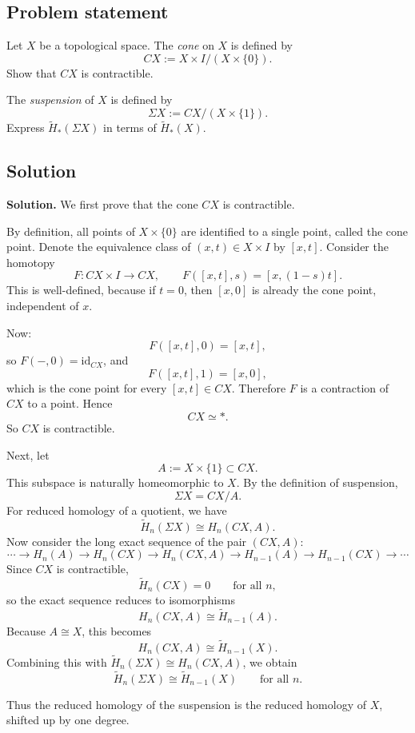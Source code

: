 \documentclass[12pt,a4paper]{article}
\theoremstyle{notespace}
\begin{document}
\subsection{Problem statement}

Let \(X\) be a topological space. The \emph{cone} on \(X\) is defined by
\[
CX := X\times I /(X\times \{0\}).
\]
Show that \(CX\) is contractible.

The \emph{suspension} of \(X\) is defined by
\[
\Sigma X := CX /(X\times \{1\}).
\]
Express \(\widetilde H_*(\Sigma X)\) in terms of \(\widetilde H_*(X)\).

\subsection{Solution}

\noindent\textbf{Solution.}
We first prove that the cone \(CX\) is contractible.

By definition, all points of \(X\times \{0\}\) are identified to a single point, called the cone point. Denote the equivalence class of \((x,t)\in X\times I\) by \([x,t]\). Consider the homotopy
\[
F:CX\times I \longrightarrow CX,
\qquad
F([x,t],s)=[x,(1-s)t].
\]
This is well-defined, because if \(t=0\), then \([x,0]\) is already the cone point, independent of \(x\).

Now:
\[
F([x,t],0)=[x,t],
\]
so \(F(-,0)=\mathrm{id}_{CX}\), and
\[
F([x,t],1)=[x,0],
\]
which is the cone point for every \([x,t]\in CX\). Therefore \(F\) is a contraction of \(CX\) to a point. Hence
\[
CX \simeq *.
\]
So \(CX\) is contractible.

Next, let
\[
A:=X\times \{1\}\subset CX.
\]
This subspace is naturally homeomorphic to \(X\). By the definition of suspension,
\[
\Sigma X = CX/A.
\]
For reduced homology of a quotient, we have
\[
\widetilde H_n(\Sigma X)\cong H_n(CX,A).
\]
Now consider the long exact sequence of the pair \((CX,A)\):
\[
\cdots \to H_n(A)\to H_n(CX)\to H_n(CX,A)\to H_{n-1}(A)\to H_{n-1}(CX)\to \cdots
\]
Since \(CX\) is contractible,
\[
\widetilde H_n(CX)=0
\qquad \text{for all } n,
\]
so the exact sequence reduces to isomorphisms
\[
H_n(CX,A)\cong \widetilde H_{n-1}(A).
\]
Because \(A\cong X\), this becomes
\[
H_n(CX,A)\cong \widetilde H_{n-1}(X).
\]
Combining this with \(\widetilde H_n(\Sigma X)\cong H_n(CX,A)\), we obtain
\[
\widetilde H_n(\Sigma X)\cong \widetilde H_{n-1}(X)
\qquad \text{for all } n.
\]

Thus the reduced homology of the suspension is the reduced homology of \(X\), shifted up by one degree.
\end{document}

